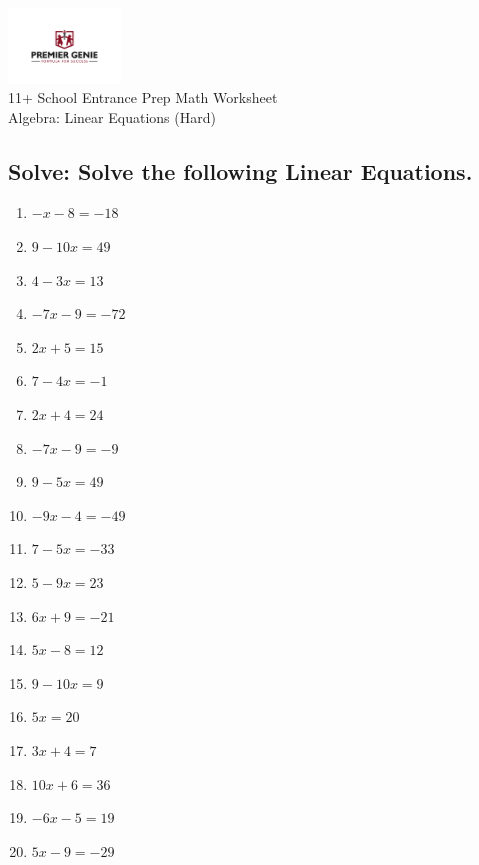 \documentclass{article}
\begin{document}
\begin{center}
\includegraphics[width=3cm]{PREMGENIEJPG.jpg}\\
{\Large 11+ School Entrance Prep Math Worksheet}\\
{\Medium Algebra: Linear Equations (Hard)}\\

\end{center}

\subsection*{Solve: Solve the following Linear Equations.}

\begin{enumerate}
\item $\displaystyle - x - 8=-18 $ \ 
\item $\displaystyle 9 - 10 x=49 $ \ 
\item $\displaystyle 4 - 3 x=13 $ \ 
\item $\displaystyle - 7 x - 9=-72 $ \ 
\item $\displaystyle 2 x + 5=15 $ \ 
\item $\displaystyle 7 - 4 x=-1 $ \ 
\item $\displaystyle 2 x + 4=24 $ \ 
\item $\displaystyle - 7 x - 9=-9 $ \ 
\item $\displaystyle 9 - 5 x=49 $ \ 
\item $\displaystyle - 9 x - 4=-49 $ \ 
\item $\displaystyle 7 - 5 x=-33 $ \ 
\item $\displaystyle 5 - 9 x=23 $ \ 
\item $\displaystyle 6 x + 9=-21 $ \ 
\item $\displaystyle 5 x - 8=12 $ \ 
\item $\displaystyle 9 - 10 x=9 $ \ 
\item $\displaystyle 5 x=20 $ \ 
\item $\displaystyle 3 x + 4=7 $ \ 
\item $\displaystyle 10 x + 6=36 $ \ 
\item $\displaystyle - 6 x - 5=19 $ \ 
\item $\displaystyle 5 x - 9=-29 $ \ 


\end{enumerate}
\end{document}
